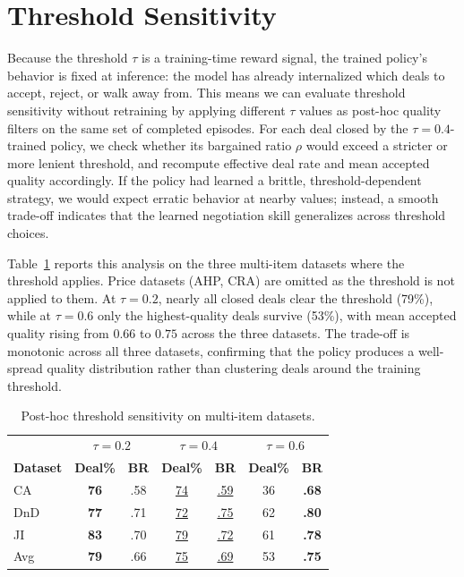 \documentclass[11pt]{article}
\newcommand{\lightrule}{\arrayrulecolor{black!20}\midrule\arrayrulecolor{black}}
\begin{document}
\section{Threshold Sensitivity}
\label{app:tau}

Because the threshold $\tau$ is a training-time reward signal, the trained policy's behavior is fixed at inference: the model has already internalized which deals to accept, reject, or walk away from. This means we can evaluate threshold sensitivity without retraining by applying different $\tau$ values as post-hoc quality filters on the same set of completed episodes. For each deal closed by the $\tau{=}0.4$-trained policy, we check whether its bargained ratio $\rho$ would exceed a stricter or more lenient threshold, and recompute effective deal rate and mean accepted quality accordingly. If the policy had learned a brittle, threshold-dependent strategy, we would expect erratic behavior at nearby values; instead, a smooth trade-off indicates that the learned negotiation skill generalizes across threshold choices.

Table~\ref{tab:tau_ablation} reports this analysis on the three multi-item datasets where the threshold applies. Price datasets (AHP, CRA) are omitted as the threshold is not applied to them. At $\tau{=}0.2$, nearly all closed deals clear the threshold (79\%), while at $\tau{=}0.6$ only the highest-quality deals survive (53\%), with mean accepted quality rising from $0.66$ to $0.75$ across the three datasets. The trade-off is monotonic across all three datasets, confirming that the policy produces a well-spread quality distribution rather than clustering deals around the training threshold.

\begin{table}[ht]
\centering
\scriptsize
\setlength{\tabcolsep}{4pt}
\renewcommand{\arraystretch}{1.15}
\begin{tabular}{l cc cc cc}
\toprule
\rowcolor{tableheader}
& \multicolumn{2}{c}{$\tau{=}0.2$} & \multicolumn{2}{c}{$\tau{=}0.4$} & \multicolumn{2}{c}{$\tau{=}0.6$} \\
\rowcolor{tableheader}
\textbf{Dataset} & \textbf{Deal\%} & \textbf{BR} & \textbf{Deal\%} & \textbf{BR} & \textbf{Deal\%} & \textbf{BR} \\
\midrule
\rowcolor{tablerow}
CA   & \textbf{76} & .58 & \underline{74} & \underline{.59} & 36 & \textbf{.68} \\
DnD  & \textbf{77} & .71 & \underline{72} & \underline{.75} & 62 & \textbf{.80} \\
\rowcolor{tablerow}
JI   & \textbf{83} & .70 & \underline{79} & \underline{.72} & 61 & \textbf{.78} \\
\lightrule
\rowcolor{tablerow}
Avg  & \textbf{79} & .66 & \underline{75} & \underline{.69} & 53 & \textbf{.75} \\
\bottomrule
\end{tabular}
\caption{Post-hoc threshold sensitivity on multi-item datasets.}
\label{tab:tau_ablation}
\end{table}
\end{document}
